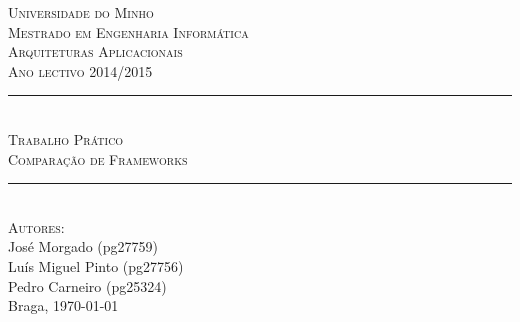 \begin{titlepage}
\onehalfspacing

\newcommand{\HRule}{\rule{\linewidth}{0.5mm}} %

\center %


\textsc{\LARGE Universidade do Minho}\\[1.5cm] %
\textsc{\Large Mestrado em Engenharia Informática}\\[0.5cm] %
\textsc{\large Arquiteturas Aplicacionais}\\[0.5cm] %
\textsc{Ano lectivo 2014/2015}\\[0.5cm]


\HRule \\[0.4cm]
\textsc{\Large Trabalho Prático}\\[0.4cm] %
\textsc{ \large Comparação de Frameworks}\\[0.4cm] %
\HRule \\[1.5cm]


\textsc{\large Autores:}\\
{
José Morgado (pg27759) \\
Luís Miguel Pinto (pg27756) \\
Pedro Carneiro (pg25324)
}\\[1cm] %


Braga, {\large \today}\\[1cm] %


\end{titlepage}
